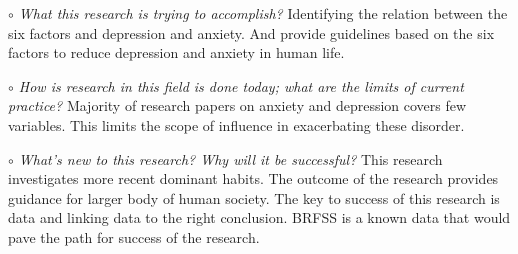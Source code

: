 \documentclass[letterpaper, 10 pt, conference]{ieeeconf}  %
\begin{document}
\noindent\textit{$\circ$ What this research is trying to accomplish?} \newline
\textnormal{
Identifying the relation between the six factors and depression and anxiety. 
And provide guidelines based on the six factors to reduce depression and anxiety in human life.
}

\setlength{\parskip}{1em} %

\par\noindent\textit{$\circ$ How is research in this field is done today; what are the limits of current practice?}\newline
\textnormal{
Majority of research papers on anxiety and depression covers few variables. 
This limits the scope of influence in exacerbating these disorder. 
}
\par\noindent\textit{$\circ$ What's new to this research? Why will it be successful?}\newline
\textnormal{
This research investigates more recent dominant habits. The outcome of the 
research provides guidance for larger body of human society. The key to success 
of this research is data and linking data to the right conclusion. 
BRFSS is a known data that would pave the path for success of the research. 
}
\end{document}

